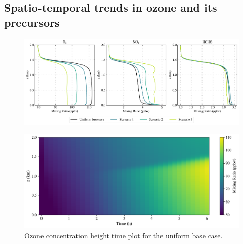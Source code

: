 \subsection{Spatio-temporal trends in ozone and its precursors}

\begin{figure}[h]
    \centering
    \includegraphics[width=\textwidth]{figures/chapter4/vertical-profiles-time36.pdf}
    \caption{}
    \label{fig:vertical-profiles-o3-nox-hcho}
  \end{figure}

\begin{figure}[h]
    \centering
    \includegraphics[width=\textwidth]{figures/chapter4/height-time-o3-uniform-basecase.pdf}
    \caption{Ozone concentration height time plot for the uniform base case.}
  \end{figure}
  
